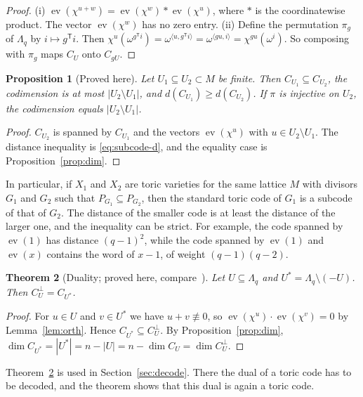 \documentclass[12pt,letterpaper]{article}
\numberwithin{equation}{section}
\newtheorem{theorem}{Theorem}[section]
\newtheorem{proposition}[theorem]{Proposition}
\theoremstyle{definition}
\theoremstyle{remark}
\DeclareMathOperator{\ev}{ev}
\newcommand{\Lq}{\Lambda_q}
\begin{document}
\begin{proof}
(i) $\ev(\chi^{u+w})=\ev(\chi^w)\ast\ev(\chi^u)$, where $\ast$ is the
coordinatewise product. The vector $\ev(\chi^w)$ has no zero entry. (ii)
Define the permutation $\pi_g$ of $\Lq$ by $i\mapsto g^{\mathsf T}i$. Then
$\chi^u(\omega^{g^{\mathsf T}i})=\omega^{\langle u,g^{\mathsf
T}i\rangle}=\omega^{\langle gu,i\rangle}=\chi^{gu}(\omega^i)$. So composing with
$\pi_g$ maps $C_U$ onto $C_{gU}$.
\end{proof}

\begin{proposition}[Proved here]\label{remark:subcode}
Let $U_1\subseteq U_2\subset M$ be finite. Then $C_{U_1}\subseteq C_{U_2}$,
the codimension is at most $|U_2\setminus U_1|$, and $d(C_{U_1})\ge
d(C_{U_2})$. If $\pi$ is injective on $U_2$, the codimension equals
$|U_2\setminus U_1|$.
\end{proposition}

\begin{proof}
$C_{U_2}$ is spanned by $C_{U_1}$ and the vectors $\ev(\chi^u)$ with $u\in
U_2\setminus U_1$. The distance inequality is \eqref{eq:subcode-d}, and the
equality case is Proposition~\ref{prop:dim}.
\end{proof}

In particular, if $X_1$ and $X_2$ are toric varieties for the same lattice $M$
with divisors $G_1$ and $G_2$ such that $P_{G_1}\subseteq P_{G_2}$, then the
standard toric code of $G_1$ is a subcode of that of $G_2$. The distance of
the smaller code is at least the distance of the larger one, and the
inequality can be strict. For example, the code spanned by $\ev(1)$ has distance $(q-1)^2$, while the
code spanned by $\ev(1)$ and $\ev(x)$ contains the word of $x-1$, of weight
$(q-1)(q-2)$.

\begin{theorem}[Duality; proved here, compare~\cite{Ru09}]\label{thm:dual}
Let $U\subseteq\Lq$ and $U^*=\Lq\setminus(-U)$. Then $C_U^\perp=C_{U^*}$.
\end{theorem}

\begin{proof}
For $u\in U$ and $v\in U^*$ we have $u+v\not\equiv0$, so
$\ev(\chi^u)\cdot\ev(\chi^v)=0$ by Lemma~\ref{lem:orth}. Hence
$C_{U^*}\subseteq C_U^\perp$. By Proposition~\ref{prop:dim},
$\dim C_{U^*}=|U^*|=n-|U|=n-\dim C_U=\dim C_U^\perp$.
\end{proof}

Theorem~\ref{thm:dual} is used in Section~\ref{sec:decode}. There the dual of
a toric code has to be decoded, and the theorem shows that this dual is again
a toric code.
\end{document}
